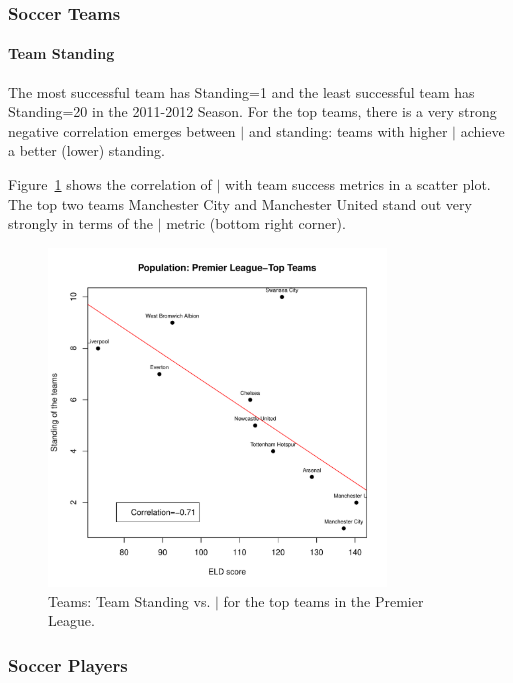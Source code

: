 {	
	

			
\subsubsection{Soccer Teams} 
\paragraph{Team Standing}
	The most successful team has Standing=1 and the least successful team has Standing=20 in the 2011-2012 Season. For the top teams, there is a very strong negative correlation emerges between $\mid$ and standing: teams with higher $\mid$ achieve a better (lower) standing. 
	
	Figure~\ref{fig:TeamStandingELD} shows the correlation of $\mid$ with team success metrics in a scatter plot. The top two teams Manchester City and Manchester United stand out very strongly in terms of the $\mid$ metric (bottom right corner).

\begin{figure}[t]
	\centering
	\includegraphics[width=0.8\textwidth]{topTeamStats-Sep.pdf}
	
	\caption{Teams: Team Standing vs. $\mid$ for the top teams in the Premier League. 
		\label{fig:TeamStandingELD}}
\end{figure}

\subsubsection{Soccer Players}

}
